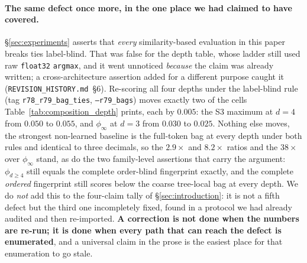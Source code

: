 \paragraph{The same defect once more, in the one place we had claimed to have covered.} \S\ref{sec:experiments} asserts that \emph{every} similarity-based evaluation in this paper breaks ties label-blind. That was false for the depth table, whose ladder still used raw \texttt{float32} \texttt{argmax}, and it went unnoticed \emph{because} the claim was already written; a cross-architecture assertion added for a different purpose caught it (\texttt{REVISION\_HISTORY.md}~\S6). Re-scoring all four depths under the label-blind rule (tag \texttt{r78\_r79\_bag\_ties}, \texttt{--r79\_bags}) moves exactly two of the cells Table~\ref{tab:composition_depth} prints, each by $0.005$: the S3 maximum at $d{=}4$ from $0.050$ to $0.055$, and $\phi_\infty$ at $d{=}3$ from $0.030$ to $0.025$. Nothing else moves, the strongest non-learned baseline is the full-token bag at every depth under both rules and identical to three decimals, so the $2.9\times$ and $8.2\times$ ratios and the $38\times$ over $\phi_\infty$ stand, as do the two family-level assertions that carry the argument: $\phi_{d\geq4}$ still equals the complete order-blind fingerprint exactly, and the complete \emph{ordered} fingerprint still scores below the coarse tree-local bag at every depth. We do \emph{not} add this to the four-claim tally of \S\ref{sec:introduction}: it is not a fifth defect but the third one incompletely fixed, found in a protocol we had already audited and then re-imported. \textbf{A correction is not done when the numbers are re-run; it is done when every path that can reach the defect is enumerated}, and a universal claim in the prose is the easiest place for that enumeration to go stale.

